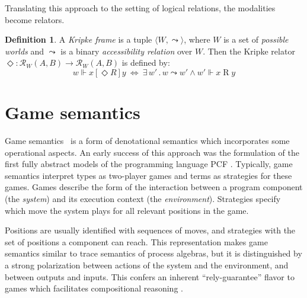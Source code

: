 \documentclass[11pt,oneside]{book}
\theoremstyle{definition}
\newtheorem{definition}[theorem]{Definition}
\newcommand{\ifr}[1]{\mathrel{[{#1}]}}
\begin{document}
Translating this approach to the setting of logical relations,
the modalities become relators.

\begin{definition} %
A \emph{Kripke frame} is a tuple
$\langle W, {\leadsto} \rangle$, where
$W$ is a set of \emph{possible worlds} and
$\leadsto$ is a
binary \emph{accessibility relation} over $W$.
Then the Kripke relator
$\Diamond : \mathcal{R}_W(A, B) \rightarrow \mathcal{R}_W(A, B)$
is defined by:
\[
  w \Vdash x \ifr{\Diamond R} y \: \Leftrightarrow \:
    \exists \, w' \,.\, w \leadsto w' \wedge
      w' \Vdash x \mathrel{R} y
\]
\end{definition}



\section{Game semantics} \label{sec:bg:gamesem} %


Game semantics~\citep{gsll,gamesem99}
is a form of denotational semantics which
incorporates some operational aspects.
An early success of this approach was
the formulation of the first fully abstract models
of the programming language PCF \citep{pcfajm,pcfho}.
Typically,
game semantics interpret
types as two-player games
and terms as strategies for these games.
Games describe the form of the interaction
between a program component %
(the \emph{system})
and its execution context
(the \emph{environment}).
Strategies
specify which move the system plays
for all relevant positions in the game.

Positions are usually identified with sequences of moves,
and strategies with the set of positions
a component can reach.
This representation makes
game semantics similar to
trace semantics of process algebras,
but it is distinguished
by a strong polarization between
actions of the system and the environment,
and between outputs and inputs.
This confers an inherent ``rely-guarantee'' flavor
to games which facilitates compositional reasoning
\citep{cspgs}.
\end{document}
